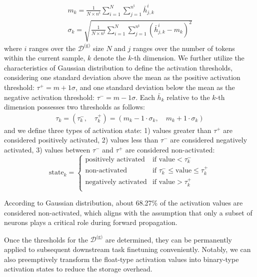 \begin{gather}
    m_k =\frac{1}{N \times n^{\text{t}}} \sum_{i=1}^{N}\sum_{j=1}^{n^{\text{t}}}\bar{h}_{j,k}^{i}
    \\
    \sigma_k = \sqrt{ \frac{1}{N \times n^{\text{t}}} \sum_{i=1}^{N}\sum_{j=1}^{n^{\text{t}}} (\bar{h}_{j,k}^{i}-m_k)^2 }
\end{gather}
where $i$ ranges over the $\mathcal{D}^{\text{(g)}}$ size $N$ and $j$ ranges over the number of tokens within the current sample, $k$ denote the $k$-th dimension. We further utilize the characteristics of Gaussian distribution to define the activation thresholds, considering one standard deviation above the mean as the positive activation threshold: $\tau^+\!=\!m+1\sigma$, and one standard deviation below the mean as the negative activation threshold: $\tau^-\!=\!m-1\sigma$. Each $\bar{h}_k$ relative to the $k$-th dimension possesses two thresholds as follows:
\begin{gather}
    \tau_k = (\tau^-_k,\quad \tau^+_k) = (m_k-1\cdot\sigma_k,\quad m_k+1\cdot\sigma_k)
\end{gather}
and we define three types of activation state: 1) values greater than $\tau^+$ are considered positively activated, 2) values less than $\tau^-$ are considered negatively activated, 3) values between $\tau^-$ and $\tau^+$ are considered non-activated:
\begin{equation}
\text{state}_{k} =  
\begin{cases}  
\text{positively activated} & \text{if } \text{value} < \tau_k^- \\
\text{non-activated} & \text{if }  \tau_k^- \le \text{value} \le \tau_k^+\\
\text{negatively activated} & \text{if } \text{value} > \tau_k^+ \\
\end{cases}
\label{eq:state}
\end{equation}

According to Gaussian distribution, about 68.27\% of the activation values are considered non-activated, which aligns with the assumption that only a subset of neurons plays a critical role during forward propagation. 

Once the thresholds for the $\mathcal{D}^{\text{(g)}}$ are determined, they can be permanently applied to subsequent downstream task finetuning conveniently.
Notably, we can also preemptively transform the float-type activation values into binary-type activation states to reduce the storage overhead.

